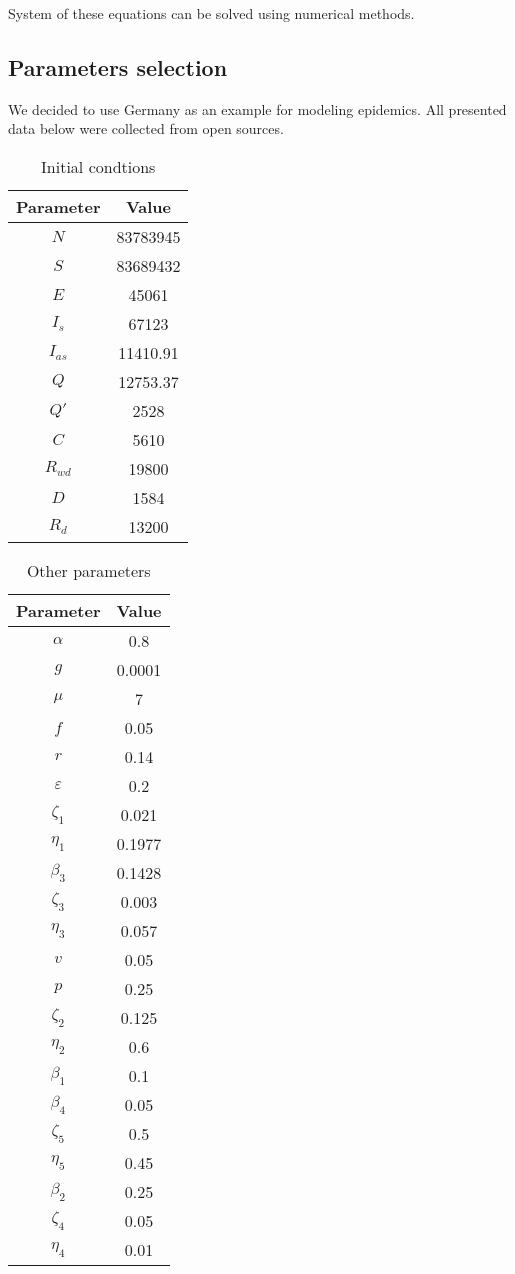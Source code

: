 \documentclass[12pt, a4paper]{article}
\begin{document}
	System of these equations can be solved using numerical methods.

	\newpage

	\subsection{Parameters selection}
	We decided to use Germany as an example for modeling epidemics. All presented data below were collected from open sources.

	\begin{longtable}[c]{| c | c |}
		\caption{Initial condtions}\\

		\hline
		Parameter & Value\\
		\hline
		$N$ & 83783945\\
		$S$ & 83689432\\
		$E$ & 45061\\
		$I_s$ & 67123\\
		$I_{as}$ & 11410.91\\
		$Q$ & 12753.37\\
		$Q'$ & 2528\\
		$C$ & 5610\\
		$R_{wd}$ & 19800\\
		$D$ & 1584\\
		$R_d$ & 13200\\
		\hline
		
	\end{longtable}

	\begin{longtable}[c]{| c | c |}
		\caption{Other parameters}\\

		\hline
		Parameter & Value\\
		\hline
		$\alpha$ & 0.8 \\
		$g$ & 0.0001 \\
		$\mu$ & 7 \\
		$f$ & 0.05\\
		$r$ & 0.14 \\
		$\varepsilon$ & 0.2 \\
		$\zeta_1$ & 0.021 \\
		$\eta_1$ & 0.1977 \\
		$\beta_3$ & 0.1428 \\
		$\zeta_3$ & 0.003 \\
		$\eta_3$ & 0.057 \\
		$v$ & 0.05 \\
		$p$ & 0.25 \\
		$\zeta_2$ & 0.125 \\
		$\eta_2$ & 0.6 \\
		$\beta_1$ & 0.1 \\
		$\beta_4$ & 0.05 \\
		$\zeta_5$ & 0.5 \\
		$\eta_5$ & 0.45 \\
		$\beta_2$ & 0.25 \\
		$\zeta_4$ & 0.05 \\
		$\eta_4$ & 0.01 \\
		\hline
		
	\end{longtable}
	
	
\end{document}

